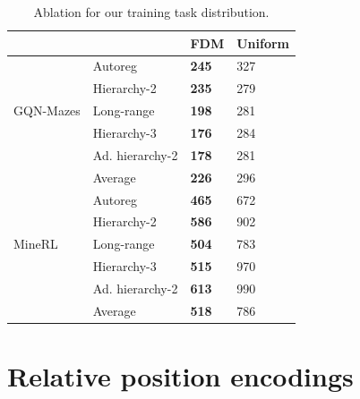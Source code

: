 \begin{table}[h]
    \centering
    \small
    \caption{Ablation for our training task distribution.}
    \label{tab:fdm-task-dist-ablation}
    \begin{tabular}{l|l|ll}
    \toprule
        ~ & ~ & FDM & Uniform \\%
        \midrule
        \multirow{5}{*}{GQN-Mazes} & Autoreg & \textbf{245} & 327 \\%
        ~ & Hierarchy-2 & \textbf{235} & 279 \\%
        ~ & Long-range & \textbf{198} & 281 \\%
        ~ & Hierarchy-3 & \textbf{176} & 284 \\%
        ~ & Ad. hierarchy-2 & \textbf{178} & 281 \\%
        ~ & Average & \textbf{226} & 296 \\%
        \midrule
        ~ & Autoreg & \textbf{465} & 672 \\%
        ~ & Hierarchy-2 & \textbf{586} & 902 \\%
        MineRL & Long-range & \textbf{504} & 783 \\%
        ~ & Hierarchy-3 & \textbf{515} & 970 \\%
        ~ & Ad. hierarchy-2 & \textbf{613} & 990 \\%
        ~ & Average & \textbf{518} & 786 \\%
        \bottomrule
    \end{tabular}
\end{table}


\section{Relative position encodings} \label{app:fdm-rpe}

